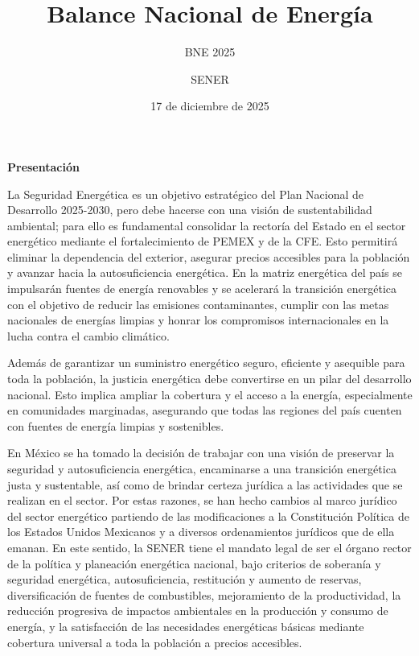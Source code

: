 \documentclass{sener2025}
\title{Balance Nacional de Energía}
\subtitle{BNE 2025}
\author{SENER}
\date{17 de diciembre de 2025}
\begin{document}

\tableofcontents
\newpage

\listafiguras
\newpage

\listatablas
\newpage

\clearpage
\begin{center}
{\Large\patriafont\bfseries\color{gobmxGuinda}Presentación}\\[1cm]
\end{center}

La Seguridad Energética es un objetivo estratégico del Plan Nacional de Desarrollo 2025-2030, pero debe hacerse con una visión de sustentabilidad ambiental; para ello es fundamental consolidar la rectoría del Estado en el sector energético mediante el fortalecimiento de PEMEX y de la CFE. Esto permitirá eliminar la dependencia del exterior, asegurar precios accesibles para la población y avanzar hacia la autosuficiencia energética. En la matriz energética del país se impulsarán fuentes de energía renovables y se acelerará la transición energética con el objetivo de reducir las emisiones contaminantes, cumplir con las metas nacionales de energías limpias y honrar los compromisos internacionales en la lucha contra el cambio climático.

Además de garantizar un suministro energético seguro, eficiente y asequible para toda la población, la justicia energética debe convertirse en un pilar del desarrollo nacional. Esto implica ampliar la cobertura y el acceso a la energía, especialmente en comunidades marginadas, asegurando que todas las regiones del país cuenten con fuentes de energía limpias y sostenibles.

En México se ha tomado la decisión de trabajar con una visión de preservar la seguridad y autosuficiencia energética, encaminarse a una transición energética justa y sustentable, así como de brindar certeza jurídica a las actividades que se realizan en el sector. Por estas razones, se han hecho cambios al marco jurídico del sector energético partiendo de las modificaciones a la Constitución Política de los Estados Unidos Mexicanos y a diversos ordenamientos jurídicos que de ella emanan. En este sentido, la SENER tiene el mandato legal de ser el órgano rector de la política y planeación energética nacional, bajo criterios de soberanía y seguridad energética, autosuficiencia, restitución y aumento de reservas, diversificación de fuentes de combustibles, mejoramiento de la productividad, la reducción progresiva de impactos ambientales en la producción y consumo de energía, y la satisfacción de las necesidades energéticas básicas mediante cobertura universal a toda la población a precios accesibles.
\end{document}
